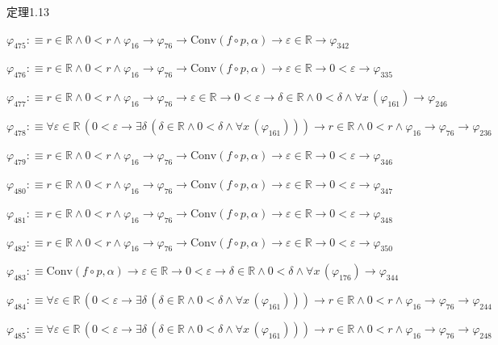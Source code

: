 \begin{fullproof}{定理1.13}
\begin{abbrevlist}
\item $\varphi_{475} :\equiv r \in \mathbb{R} \land 0 < r \land \varphi_{16} \to \varphi_{76} \to \mathrm{Conv}(f \circ p,\alpha) \to \varepsilon \in \mathbb{R} \to \varphi_{342}$
\item $\varphi_{476} :\equiv r \in \mathbb{R} \land 0 < r \land \varphi_{16} \to \varphi_{76} \to \mathrm{Conv}(f \circ p,\alpha) \to \varepsilon \in \mathbb{R} \to 0 < \varepsilon \to \varphi_{335}$
\item $\varphi_{477} :\equiv r \in \mathbb{R} \land 0 < r \land \varphi_{16} \to \varphi_{76} \to \varepsilon \in \mathbb{R} \to 0 < \varepsilon \to \delta \in \mathbb{R} \land 0 < \delta \land \forall x\,(\varphi_{161}) \to \varphi_{246}$
\item $\varphi_{478} :\equiv \forall \varepsilon \in \mathbb{R}\,(0 < \varepsilon \to \exists \delta\,(\delta \in \mathbb{R} \land 0 < \delta \land \forall x\,(\varphi_{161}))) \to r \in \mathbb{R} \land 0 < r \land \varphi_{16} \to \varphi_{76} \to \varphi_{236}$
\item $\varphi_{479} :\equiv r \in \mathbb{R} \land 0 < r \land \varphi_{16} \to \varphi_{76} \to \mathrm{Conv}(f \circ p,\alpha) \to \varepsilon \in \mathbb{R} \to 0 < \varepsilon \to \varphi_{346}$
\item $\varphi_{480} :\equiv r \in \mathbb{R} \land 0 < r \land \varphi_{16} \to \varphi_{76} \to \mathrm{Conv}(f \circ p,\alpha) \to \varepsilon \in \mathbb{R} \to 0 < \varepsilon \to \varphi_{347}$
\item $\varphi_{481} :\equiv r \in \mathbb{R} \land 0 < r \land \varphi_{16} \to \varphi_{76} \to \mathrm{Conv}(f \circ p,\alpha) \to \varepsilon \in \mathbb{R} \to 0 < \varepsilon \to \varphi_{348}$
\item $\varphi_{482} :\equiv r \in \mathbb{R} \land 0 < r \land \varphi_{16} \to \varphi_{76} \to \mathrm{Conv}(f \circ p,\alpha) \to \varepsilon \in \mathbb{R} \to 0 < \varepsilon \to \varphi_{350}$
\item $\varphi_{483} :\equiv \mathrm{Conv}(f \circ p,\alpha) \to \varepsilon \in \mathbb{R} \to 0 < \varepsilon \to \delta \in \mathbb{R} \land 0 < \delta \land \forall x\,(\varphi_{176}) \to \varphi_{344}$
\item $\varphi_{484} :\equiv \forall \varepsilon \in \mathbb{R}\,(0 < \varepsilon \to \exists \delta\,(\delta \in \mathbb{R} \land 0 < \delta \land \forall x\,(\varphi_{161}))) \to r \in \mathbb{R} \land 0 < r \land \varphi_{16} \to \varphi_{76} \to \varphi_{244}$
\item $\varphi_{485} :\equiv \forall \varepsilon \in \mathbb{R}\,(0 < \varepsilon \to \exists \delta\,(\delta \in \mathbb{R} \land 0 < \delta \land \forall x\,(\varphi_{161}))) \to r \in \mathbb{R} \land 0 < r \land \varphi_{16} \to \varphi_{76} \to \varphi_{248}$

\end{abbrevlist}
\end{fullproof}

